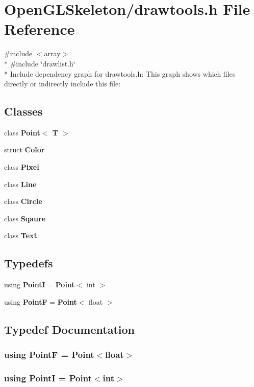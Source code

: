 \section{Open\+G\+L\+Skeleton/drawtools.h File Reference}
\label{drawtools_8h}
{\ttfamily \#include $<$array$>$}\\*
{\ttfamily \#include \char`\"{}drawlist.\+h\char`\"{}}\\*
Include dependency graph for drawtools.\+h\+:
This graph shows which files directly or indirectly include this file\+:
\subsection*{Classes}
\begin{DoxyCompactItemize}
\item 
class {\bf Point$<$ T $>$}
\item 
struct {\bf Color}
\item 
class {\bf Pixel}
\item 
class {\bf Line}
\item 
class {\bf Circle}
\item 
class {\bf Sqaure}
\item 
class {\bf Text}
\end{DoxyCompactItemize}
\subsection*{Typedefs}
\begin{DoxyCompactItemize}
\item 
using {\bf PointI} = {\bf Point}$<$ int $>$
\item 
using {\bf PointF} = {\bf Point}$<$ float $>$
\end{DoxyCompactItemize}


\subsection{Typedef Documentation}
\subsubsection[{PointF}]{\setlength{\rightskip}{0pt plus 5cm}using {\bf PointF} =  {\bf Point}$<$float$>$}\label{drawtools_8h_adc4a66bcb59b74164130ed47cb387ec3}
\subsubsection[{PointI}]{\setlength{\rightskip}{0pt plus 5cm}using {\bf PointI} =  {\bf Point}$<$int$>$}\label{drawtools_8h_aca011a8a706ad4f0b3d267cf3b099fac}
